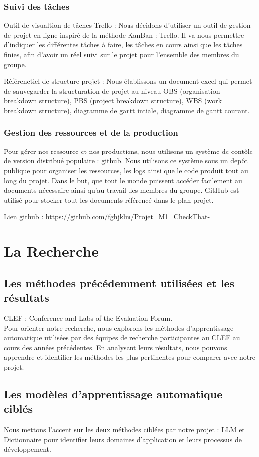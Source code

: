 \documentclass[11pt]{rapport_class}
\begin{document}
\subsection{Suivi des tâches}
Outil de visualtion de tâches Trello : Nous décidons d’utiliser un outil de gestion de projet en ligne inspiré de la méthode KanBan : Trello. Il va nous permettre d’indiquer les différentes tâches à faire, les tâches en cours ainsi que les tâches finies, afin d’avoir un réel suivi sur le projet pour l’ensemble des membres du groupe.

Référenctiel de structure projet : Nous établissons un document excel qui permet de sauvegarder la structuration de projet au niveau OBS (organisation breakdown structure), PBS (project breakdown structure), WBS (work breakdown structure), diagramme de gantt intiale, diagramme de gantt courant.

\subsection{Gestion des ressources et de la production}
Pour gérer nos ressource et nos productions, nous utilisons un système de contôle de version distribué populaire : github. Nous utilisons ce système sous un depôt publique pour organiser les ressources, les logs ainsi que le code produit tout au long du projet. Dans le but, que tout le monde puissent accéder facilement au documents nécessaire ainsi qu’au travail des membres du groupe. GitHub est utilisé pour stocker tout les documents référencé dans le plan projet.

Lien github : \url{https://github.com/fghjklm/Projet_M1_CheckThat-}


\chapter{La Recherche}
\section{Les méthodes précédemment utilisées et les résultats}
CLEF : Conference and Labs of the Evaluation Forum.\\
Pour orienter notre recherche, nous explorons les méthodes d'apprentissage automatique utilisées par des équipes de recherche participantes au CLEF au cours des années précédentes. En analysant leurs résultats, nous pouvons apprendre et identifier les méthodes les plus pertinentes pour comparer avec notre projet.

\section{Les modèles d'apprentissage automatique ciblés}
Nous mettons l'accent sur les deux méthodes ciblées par notre projet : LLM et Dictionnaire pour identifier leurs domaines d'application et leurs processus de développement.
\end{document}
